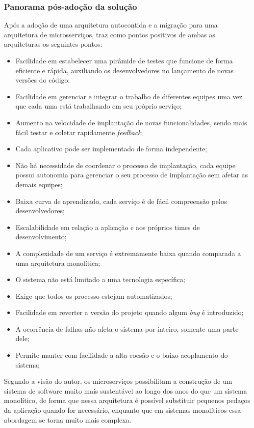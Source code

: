 \subsubsection{Panorama pós-adoção da solução}

Após a adoção de uma arquitetura autocontida e a migração para uma arquitetura de microsserviços,
 traz como pontos positivos de ambas as arquiteturas os
seguintes pontos:

\begin{itemize}
    \item Facilidade em estabelecer uma pirâmide de testes que funcione de forma eficiente e rápida,
        auxiliando os desenvolvedores no lançamento de novas versões do código;
    \item Facilidade em gerenciar e integrar o trabalho de diferentes equipes uma vez que cada uma
        está trabalhando em seu próprio serviço;
    \item Aumento na velocidade de implantação de novas funcionalidades, sendo mais fácil testar e
        coletar rapidamente \textit{feedback};
    \item Cada aplicativo pode ser implementado de forma independente;
    \item Não há necessidade de coordenar o processo de implantação, cada equipe possui autonomia
        para gerenciar o seu processo de implantação sem afetar as demais equipes;
    \item Baixa curva de aprendizado, cada serviço é de fácil compreensão pelos desenvolvedores;
    \item Escalabilidade em relação a aplicação e aos próprios times de desenvolvimento;
    \item A complexidade de um serviço é extremamente baixa quando comparada a uma arquitetura
        monolítica;
    \item O sistema não está limitado a uma tecnologia específica;
    \item Exige que todos os processo estejam automatizados;
    \item Facilidade em reverter a versão do projeto quando algum \textit{bug} é introduzido;
    \item A ocorrência de falhas não afeta o sistema por inteiro, somente uma parte dele;
    \item Permite manter com facilidade a alta coesão e o baixo acoplamento do sistema;
\end{itemize}

Segundo a visão do autor, os microserviços possibilitam a construção de um sistema de software muito
mais sustentável ao longo dos anos do que um sistema monolítico, de forma que nessa arquitetura é
possível substituir pequenos pedaços da aplicação quando for necessário, enquanto que em sistemas
monolíticos essa abordagem se torna muito mais complexa.

